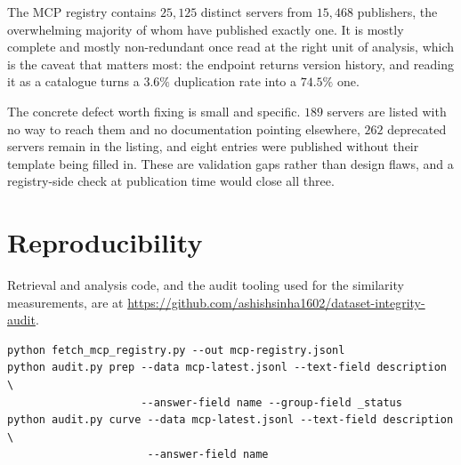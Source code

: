 \documentclass[11pt]{article}
\begin{document}
The MCP registry contains $25{,}125$ distinct servers from $15{,}468$
publishers, the overwhelming majority of whom have published exactly one. It
is mostly complete and mostly non-redundant once read at the right unit of
analysis, which is the caveat that matters most: the endpoint returns version
history, and reading it as a catalogue turns a $3.6\%$ duplication rate into a
$74.5\%$ one.

The concrete defect worth fixing is small and specific. $189$ servers are
listed with no way to reach them and no documentation pointing elsewhere,
$262$ deprecated servers remain in the listing, and eight entries were
published without their template being filled in. These are validation gaps rather than design flaws, and a registry-side
check at publication time would close all three.

\section*{Reproducibility}

Retrieval and analysis code, and the audit tooling used for the similarity
measurements, are at
\url{https://github.com/ashishsinha1602/dataset-integrity-audit}.

\begin{verbatim}
python fetch_mcp_registry.py --out mcp-registry.jsonl
python audit.py prep --data mcp-latest.jsonl --text-field description \
                     --answer-field name --group-field _status
python audit.py curve --data mcp-latest.jsonl --text-field description \
                      --answer-field name
\end{verbatim}
\end{document}
